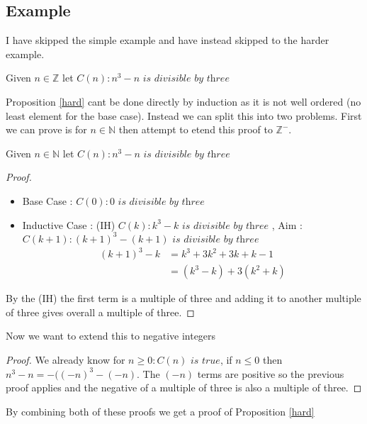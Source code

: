 \documentclass{article}
\begin{document}
\subsection{Example}
I have skipped the simple example and have instead skipped to the harder example.
\begin{proposition} \label{hard}
    Given $n \in \mathbb{Z}$ let $C(n) : n^3 - n \textit{ is divisible by three}$
\end{proposition}
Proposition \ref{hard} cant be done directly by induction as it is not well ordered (no least element for the base case). Instead we can split this into two problems. First we can prove is for $n \in \mathbb{N}$ then attempt to etend this proof to $\mathbb{Z}^-$.
\begin{proposition}
    Given $n \in \mathbb{N}$ let $C(n) : n^3 - n \textit{ is divisible by three}$
\end{proposition}
\begin{proof}
\phantom{HIII}
    \begin{itemize}
        \item Base Case : $C(0) : 0 \textit{ is divisible by three}$
        \item Inductive Case : (IH) $C(k) : k^3 - k \textit{ is divisible by three}$ , Aim : $C(k + 1) : (k + 1)^3 - (k + 1) \textit{ is divisible by three}$
        \begin{align*}
            (k+1)^3 - k &= k^3 + 3k^2 + 3k + k-1 \\
                        &= (k^3 - k) + 3(k^2 + k)
        \end{align*}
    \end{itemize}
    By the (IH) the first term is a multiple of three and adding it to another multiple of three gives overall a multiple of three.
\end{proof}
Now we want to extend this to negative integers
\begin{proof}
    We already know for $n \ge 0 : C(n) \textit{ is true}$, if $n \le 0$  then $n^3 - n = -((-n)^3 - (-n)$. The $(-n)$ terms are positive so the previous proof applies and the negative of a multiple of three is also a multiple of three.
\end{proof}
By combining both of these proofs we get a proof of Proposition \ref{hard}
\end{document}
